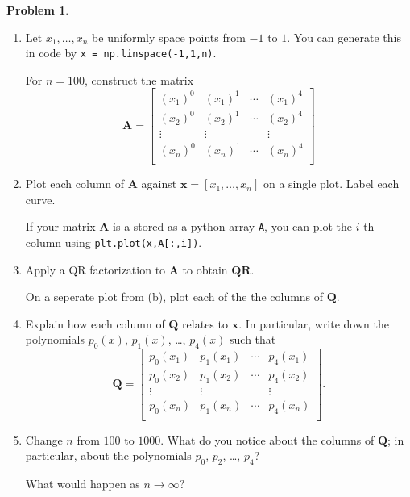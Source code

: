 \documentclass[12pt]{article}
\theoremstyle{definition}
\newtheorem{problem}{Problem}
\renewcommand{\vec}{\mathbf}
\begin{document}
\begin{problem}

    \begin{enumerate}
        \item
            Let $x_1, \ldots, x_n$ be uniformly space points from $-1$ to $1$.
            You can generate this in code by \lstinline{x = np.linspace(-1,1,n)}.

            For $n=100$, construct the matrix
            \[
                \vec{A} = 
                \begin{bmatrix}
                    (x_1)^0 & (x_1)^1 & \cdots & (x_1)^4 \\
                    (x_2)^0 & (x_2)^1 & \cdots & (x_2)^4 \\ 
                    \vdots & \vdots & & \vdots \\
                    (x_n)^0 & (x_n)^1 & \cdots & (x_n)^4 \\
                \end{bmatrix}
            \]
        \item 
            Plot each column of $\vec{A}$ against $\vec{x} = [x_1, \ldots, x_n]$ on a single plot. 
            Label each curve. 
            
            If your matrix $\vec{A}$ is a stored as a python array \lstinline{A}, you can plot the $i$-th column using \lstinline{plt.plot(x,A[:,i])}.

        \item Apply a QR factorization to $\vec{A}$ to obtain $\vec{Q}\vec{R}$.

            On a seperate plot from (b), plot each of the the columns of $\vec{Q}$.

        \item 
            Explain how each column of $\vec{Q}$ relates to $\vec{x}$.
            In particular, write down the polynomials $p_0(x)$, $p_1(x)$, \ldots, $p_4(x)$ such that 
            \[
                \vec{Q} = 
                \begin{bmatrix}
                    p_0(x_1) & p_1(x_1) & \cdots & p_4(x_1) \\
                    p_0(x_2) & p_1(x_2) & \cdots & p_4(x_2) \\ 
                    \vdots & \vdots & & \vdots \\
                    p_0(x_n) & p_1(x_n) & \cdots & p_4(x_n) \\
                \end{bmatrix}.
            \]
        \item Change $n$ from $100$ to $1000$. 
            What do you notice about the columns of $\vec{Q}$; in particular, about the polynomials $p_0$, $p_2$, \ldots, $p_4$?
            
            What would happen as $n\to\infty$?
    \end{enumerate}

\end{problem}
\end{document}
